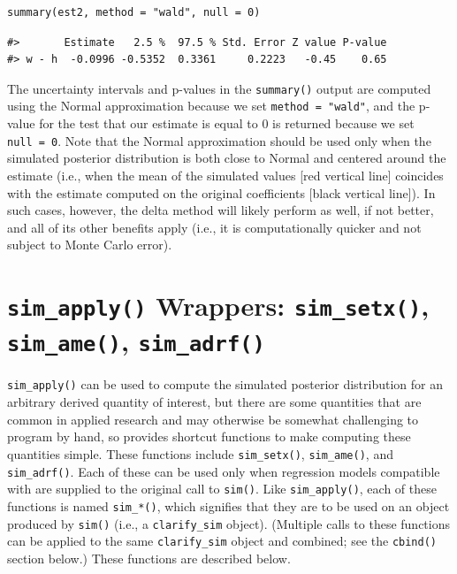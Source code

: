 \begin{verbatim}
summary(est2, method = "wald", null = 0)
\end{verbatim}
\begin{verbatim}
#>       Estimate   2.5 %  97.5 % Std. Error Z value P-value
#> w - h  -0.0996 -0.5352  0.3361     0.2223   -0.45    0.65
\end{verbatim}
The uncertainty intervals and p-values in the \texttt{summary()} output are computed using the Normal approximation because we set \texttt{method\ =\ "wald"}, and the p-value for the test that our estimate is equal to 0 is returned because we set \texttt{null\ =\ 0}. Note that the Normal approximation should be used only when the simulated posterior distribution is both close to Normal and centered around the estimate (i.e., when the mean of the simulated values {[}red vertical line{]} coincides with the estimate computed on the original coefficients {[}black vertical line{]}). In such cases, however, the delta method will likely perform as well, if not better, and all of its other benefits apply (i.e., it is computationally quicker and not subject to Monte Carlo error).
\section{\texorpdfstring{\texttt{sim\_apply()} Wrappers: \texttt{sim\_setx()}, \texttt{sim\_ame()}, \texttt{sim\_adrf()}}{sim\_apply() Wrappers: sim\_setx(), sim\_ame(), sim\_adrf()}}\label{sim_apply-wrappers-sim_setx-sim_ame-sim_adrf}
\texttt{sim\_apply()} can be used to compute the simulated posterior distribution for an arbitrary derived quantity of interest, but there are some quantities that are common in applied research and may otherwise be somewhat challenging to program by hand, so  provides shortcut functions to make computing these quantities simple. These functions include \texttt{sim\_setx()}, \texttt{sim\_ame()}, and \texttt{sim\_adrf()}. Each of these can be used only when regression models compatible with  are supplied to the original call to \texttt{sim()}.
Like \texttt{sim\_apply()}, each of these functions is named \texttt{sim\_*()}, which signifies that they are to be used on an object produced by \texttt{sim()} (i.e., a \texttt{clarify\_sim} object). (Multiple calls to these functions can be applied to the same \texttt{clarify\_sim} object and combined; see the \texttt{cbind()} section below.) These functions are described below.
